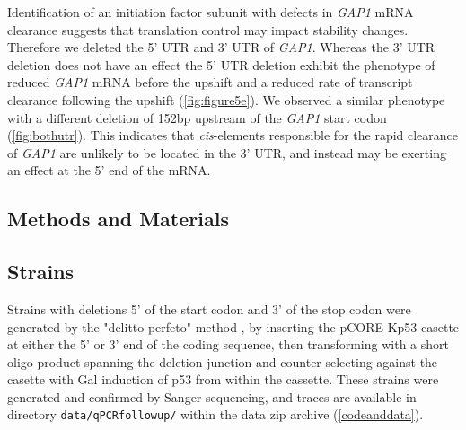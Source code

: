 {Identification of an initiation factor subunit with defects in
\textit{GAP1} mRNA clearance suggests that translation control may
impact stability changes. Therefore we deleted the 5' UTR
and 3' UTR of \textit{GAP1}. 
Whereas the 3’ UTR deletion does not have an effect the 5’ UTR deletion
exhibit the phenotype of reduced \textit{GAP1} mRNA before the upshift
and a reduced rate of transcript clearance following the upshift
(\autoref{fig:figure5e}). 
We observed a similar phenotype with a different deletion of 152bp upstream
of the \textit{GAP1} start codon (\autoref{fig:bothutr}). 
This indicates that \textit{cis}-elements responsible for the
rapid clearance of \textit{GAP1} are unlikely to be located in the
3' UTR, and instead may be exerting an effect at the 5' end of the
mRNA.



\subsection{Methods and Materials}

\subsection{Strains}

Strains with deletions 5' of the start codon and 3' of the stop
codon were generated by the "delitto-perfeto" 
method \parencite{storici2006delitto}, 
by inserting the pCORE-Kp53 casette
at either the 5' or 3' end of the coding sequence, then transforming
with a short oligo product spanning the deletion junction and
counter-selecting against the casette with Gal induction of p53 
from within the cassette.
These strains were generated and confirmed by Sanger sequencing,
and traces are available in directory \texttt{data/qPCRfollowup/} 
within the data zip archive (\autoref{codeanddata}).

}
